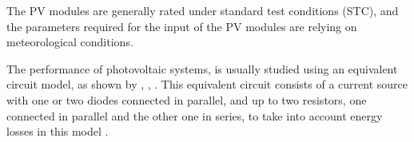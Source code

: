 \documentclass[journal]{IEEEtran}
\begin{document}
%
%
The PV modules are generally rated under standard test conditions (STC), and the parameters required for the input of the PV modules are relying on meteorological conditions.
%
%
% 
  
The performance of photovoltaic systems, %
is usually studied using an equivalent circuit model, as shown by \cite{Yatimi}, \cite{Saloux}, \cite{Mellit}. This equivalent circuit consists of a current source with one or two diodes connected in parallel, and up to two resistors, one connected in parallel and the other one in series, to take into account energy losses in this model \cite{Cubas}. 
\end{document}
